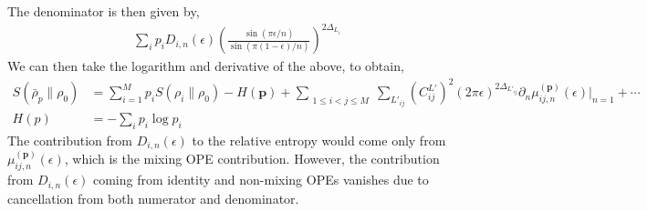 \documentclass[11pt]{article}
\newcommand{\ep}{\epsilon}
\newcommand{\p}{\partial}
\newcommand{\lb}{\left(}
\newcommand{\rb}{\right)}
\begin{document}
The denominator is then given by,
\begin{align}
    \sum_i p_i D_{i,n}(\ep) \lb\frac{\sin (\pi \ep/n)}{\sin (\pi (1-\ep)/n)}\rb^{2\Delta_{L_i}}
\end{align}
We can then take the logarithm and derivative of the above, to obtain,
\begin{align}
    S(\bar{\rho}_p\| \rho_0) 
    &= \sum_{i=1}^M p_i S(\rho_i \|\rho_0) - H(\textbf{p}) +   \sum_{\substack{1\leq i<j\leq M}}\sum_{L'_{ij}} \lb C_{ij}^{L'}\rb^2(2\pi\ep)^{2\Delta_{L'_{ij}}}\p_n  \mu_{ij,n}^{(\textbf{p})}(\ep) \Big|_{n=1}+\cdots\\
    H(p) &= -\sum_i p_i \log p_i
\end{align}
The contribution from $D_{i,n}(\ep)$ to the relative entropy would come only from $\mu_{ij,n}^{(\textbf{p})}(\ep)$, which is the mixing OPE contribution. However, the contribution from $D_{i,n}(\ep)$ coming from identity and non-mixing OPEs vanishes due to cancellation from both numerator and denominator. 
\end{document}
